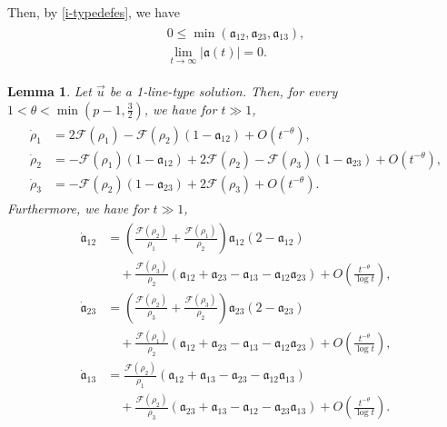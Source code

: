 \documentclass[10pt,a4paper]{amsart}
\newtheorem{lemma}[theorem]{Lemma}
\numberwithin{equation}{section}
\begin{document}
Then, by \eqref{i-typedefes}, we have
\begin{align}\label{linenaisekiga1}
\begin{aligned}
0\leq \min{(\mathfrak{a}_{12},\mathfrak{a}_{23},\mathfrak{a}_{13})},
\\
\lim_{t\to\infty}|\mathfrak{a}(t)|=0.
\end{aligned}
\end{align}





\begin{lemma}\label{line-type-naisekinagasaode}
Let $\vec{u}$ be a 1-line-type solution. Then, for every $1<\theta<\min{(p-1,\frac{3}{2})}$, we have for $t\gg 1$,
\begin{align}\label{1-line-typenagasaode}
\begin{aligned}
\dot{\rho}_1&=2\mathcal{F}(\rho_1)-\mathcal{F}(\rho_2)(1-\mathfrak{a}_{12})+O\left(t^{-\theta}\right),
\\
\dot{\rho}_2&=-\mathcal{F}(\rho_1)(1-\mathfrak{a}_{12})+2\mathcal{F}(\rho_2)-\mathcal{F}(\rho_3)(1-\mathfrak{a}_{23})+O\left(t^{-\theta}\right),
\\
\dot{\rho}_3&=-\mathcal{F}(\rho_2)(1-\mathfrak{a}_{23})+2\mathcal{F}(\rho_3)+O\left(t^{-\theta}\right).
\end{aligned}
\end{align}
Furthermore, we have for $t\gg 1$,
\begin{align}\label{kinenaisekiode}
\begin{aligned}
\dot{\mathfrak{a}}_{12}&=\left(\frac{\mathcal{F}(\rho_2)}{\rho_1}+\frac{\mathcal{F}(\rho_1)}{\rho_2}\right)\mathfrak{a}_{12}\left(2-\mathfrak{a}_{12}\right)
\\
&\quad+\frac{\mathcal{F}(\rho_3)}{\rho_2}\left(\mathfrak{a}_{12}+\mathfrak{a}_{23}-\mathfrak{a}_{13}-\mathfrak{a}_{12}\mathfrak{a}_{23}\right)+O\left(\frac{t^{-\theta}}{\log{t}}\right),
\\
\dot{\mathfrak{a}}_{23}&=\left(\frac{\mathcal{F}(\rho_2)}{\rho_3}+\frac{\mathcal{F}(\rho_3)}{\rho_2}\right)\mathfrak{a}_{23}\left(2-\mathfrak{a}_{23}\right)
\\
&\quad+\frac{\mathcal{F}(\rho_1)}{\rho_2}\left(\mathfrak{a}_{12}+\mathfrak{a}_{23}-\mathfrak{a}_{13}-\mathfrak{a}_{12}\mathfrak{a}_{23}\right)+O\left(\frac{t^{-\theta}}{\log{t}}\right),
\\
\dot{\mathfrak{a}}_{13}&=\frac{\mathcal{F}(\rho_2)}{\rho_1}\left(\mathfrak{a}_{12}+\mathfrak{a}_{13}-\mathfrak{a}_{23}-\mathfrak{a}_{12}\mathfrak{a}_{13}\right)
\\
&\quad+\frac{\mathcal{F}(\rho_2)}{\rho_3}\left(\mathfrak{a}_{23}+\mathfrak{a}_{13}-\mathfrak{a}_{12}-\mathfrak{a}_{23}\mathfrak{a}_{13}\right)+O\left(\frac{t^{-\theta}}{\log{t}}\right).
\end{aligned}
\end{align}
\end{lemma}
\end{document}

